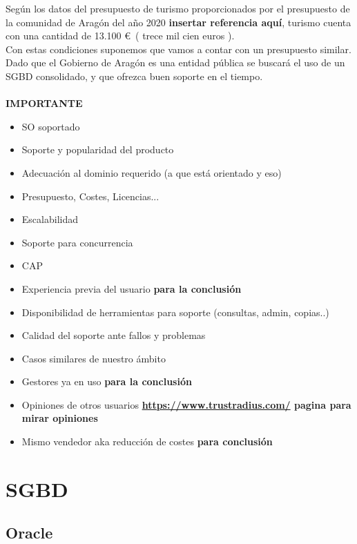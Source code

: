 \documentclass{article}
\begin{document}
Según los datos del presupuesto de turismo proporcionados por el presupuesto de la comunidad de Aragón del año 2020 \textbf{insertar referencia aquí}, turismo cuenta con una cantidad de 13.100 \euro \ ( trece mil cien euros ).\\
Con estas condiciones suponemos que vamos a contar con un presupuesto similar.\\

Dado que el Gobierno de Aragón es una entidad pública se buscará el uso de un SGBD consolidado, y que ofrezca buen soporte en el tiempo. \\\\


\textbf{IMPORTANTE}
\begin{itemize}
\item SO soportado
\item Soporte y popularidad del producto
\item Adecuación al dominio requerido (a que está orientado y eso)
\item Presupuesto, Costes, Licencias... 
\item Escalabilidad 
\item Soporte para concurrencia
\item CAP
\item Experiencia previa del usuario  \textbf{para la conclusión}
\item Disponibilidad de herramientas para soporte (consultas, admin, copias..)
\item Calidad del soporte ante fallos y problemas
\item Casos similares de nuestro ámbito 
\item Gestores ya en uso \textbf{para la conclusión}
\item Opiniones de otros usuarios \textbf{\url{https://www.trustradius.com/} pagina para mirar opiniones}
\item Mismo vendedor aka reducción de costes \textbf{para conclusión}
\end{itemize}

\section{SGBD}

\subsection{Oracle}
\end{document}
